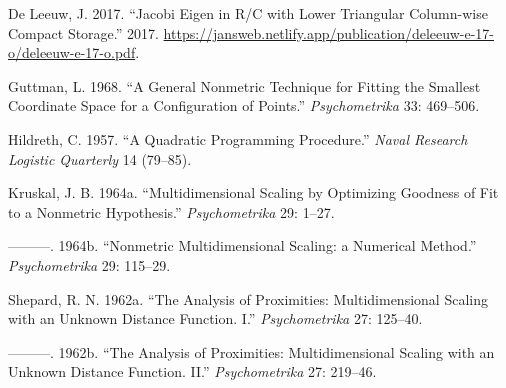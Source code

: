 \documentclass[
  12pt,
]{article}
\newlength{\cslhangindent}
\newenvironment{CSLReferences}[2] %
 {\begin{list}{}{%
  \setlength{\itemindent}{0pt}
  \setlength{\leftmargin}{0pt}
  \setlength{\parsep}{0pt}
  \ifodd #1
   \setlength{\leftmargin}{\cslhangindent}
   \setlength{\itemindent}{-1\cslhangindent}
  \fi
  \setlength{\itemsep}{#2\baselineskip}}}
 {\end{list}}
\begin{document}
\label{refs}
\begin{CSLReferences}{1}{0}
De Leeuw, J. 2017. {``{Jacobi Eigen in R/C with Lower Triangular Column-wise Compact Storage}.''} 2017. \url{https://jansweb.netlify.app/publication/deleeuw-e-17-o/deleeuw-e-17-o.pdf}.

Guttman, L. 1968. {``{A General Nonmetric Technique for Fitting the Smallest Coordinate Space for a Configuration of Points}.''} \emph{Psychometrika} 33: 469--506.

Hildreth, C. 1957. {``{A Quadratic Programming Procedure}.''} \emph{Naval Research Logistic Quarterly} 14 (79--85).

Kruskal, J. B. 1964a. {``{Multidimensional Scaling by Optimizing Goodness of Fit to a Nonmetric Hypothesis}.''} \emph{Psychometrika} 29: 1--27.

---------. 1964b. {``{Nonmetric Multidimensional Scaling: a Numerical Method}.''} \emph{Psychometrika} 29: 115--29.

Shepard, R. N. 1962a. {``{The Analysis of Proximities: Multidimensional Scaling with an Unknown Distance Function. I}.''} \emph{Psychometrika} 27: 125--40.

---------. 1962b. {``{The Analysis of Proximities: Multidimensional Scaling with an Unknown Distance Function. II}.''} \emph{Psychometrika} 27: 219--46.

\end{CSLReferences}
\end{document}
